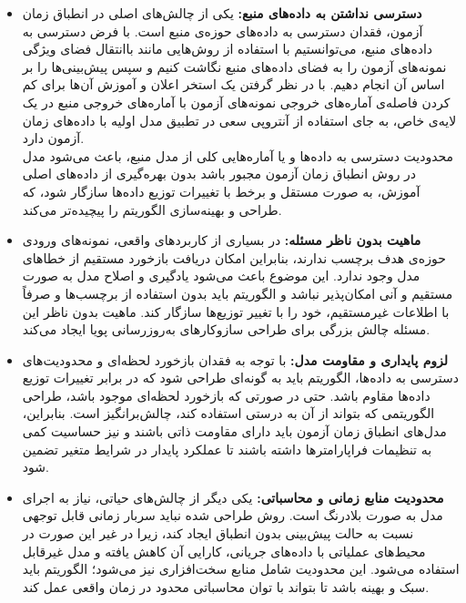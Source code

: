 \begin{itemize}
	\item \textbf{دسترسی نداشتن به داده‌های منبع:}
	یکی از چالش‌های اصلی در انطباق زمان آزمون، فقدان دسترسی به داده‌های حوزه‌ی منبع است. 
	با فرض دسترسی به داده‌های منبع، می‌توانستیم با استفاده از روش‌هایی مانند \cite{gan,diffusion} باانتقال فضای ویژگی  
	نمونه‌های آزمون را به فضای داده‌های منبع نگاشت کنیم و سپس پیش‌بینی‌ها را بر اساس آن انجام دهیم. \cite{dpcore} با در نظر گرفتن یک {استخر اعلان} و آموزش آن‌ها برای کم کردن فاصله‌ی آماره‌های خروجی نمونه‌های آزمون با آماره‌های خروجی منبع در یک لایه‌ی خاص، به جای استفاده از آنتروپی سعی در تطبیق مدل اولیه با داده‌های زمان آزمون دارد.\\
	محدودیت دسترسی به داده‌ها و یا آماره‌هایی کلی از مدل منبع، باعث می‌شود مدل در روش انطباق زمان آزمون مجبور باشد بدون بهره‌گیری از داده‌های اصلی آموزش، به صورت مستقل و برخط با تغییرات توزیع داده‌ها سازگار شود، 
	که طراحی و بهینه‌سازی الگوریتم را پیچیده‌تر می‌کند.
	
	\item \textbf{ماهیت بدون ناظر مسئله:}
	در بسیاری از کاربردهای واقعی، نمونه‌های ورودی حوزه‌ی هدف برچسب ندارند، 
	بنابراین امکان دریافت بازخورد مستقیم از خطاهای مدل وجود ندارد. 
	این موضوع باعث می‌شود یادگیری و اصلاح مدل به صورت مستقیم و آنی امکان‌پذیر نباشد 
	و الگوریتم باید بدون استفاده از برچسب‌ها و صرفاً با اطلاعات غیرمستقیم، خود را با تغییر توزیع‌ها سازگار کند. 
	ماهیت بدون ناظر این مسئله چالش بزرگی برای طراحی سازوکار‌های به‌روزرسانی پویا ایجاد می‌کند.
	
	\item \textbf{لزوم پایداری و مقاومت مدل:}
	با توجه به فقدان بازخورد لحظه‌ای و محدودیت‌های دسترسی به داده‌ها، 
	الگوریتم باید به گونه‌ای طراحی شود که در برابر تغییرات توزیع داده‌ها مقاوم باشد. 
	حتی در صورتی که بازخورد لحظه‌ای موجود باشد، طراحی الگوریتمی که بتواند از آن به درستی استفاده کند، چالش‌برانگیز است. 
	بنابراین، مدل‌های انطباق زمان آزمون باید دارای {مقاومت ذاتی} باشند 
	و نیز حساسیت کمی به تنظیمات فراپارامترها داشته باشند تا عملکرد پایدار در شرایط متغیر تضمین شود.
	
	\item \textbf{محدودیت منابع زمانی و محاسباتی:}
	یکی دیگر از چالش‌های حیاتی، نیاز به اجرای مدل به صورت {بلادرنگ} است. 
	روش طراحی شده نباید سربار زمانی قابل توجهی نسبت به حالت پیش‌بینی بدون انطباق ایجاد کند، 
	زیرا در غیر این صورت در محیط‌های عملیاتی با داده‌های جریانی، کارایی آن کاهش یافته و مدل غیرقابل استفاده می‌شود. 
	این محدودیت شامل منابع سخت‌افزاری نیز می‌شود؛ الگوریتم باید سبک و بهینه باشد 
	تا بتواند با توان محاسباتی محدود در زمان واقعی عمل کند.
	

\end{itemize}
